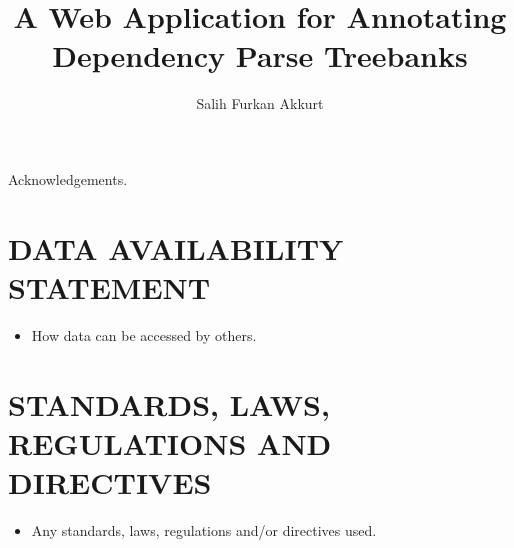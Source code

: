 \documentclass[a4paper,onesided,12pt]{report}
\title{A Web Application for Annotating Dependency Parse Treebanks}
\author{Salih Furkan Akkurt}
\begin{document}
\makebstitle  %
\makeapprovalpage
\begin{acknowledgements}
Acknowledgements.
\end{acknowledgements}




\tableofcontents
\listoffigures
\listoftables
\begin{symbols}


\end{symbols}

\begin{abbreviations}
\end{abbreviations}











\appendix
\chapter{DATA AVAILABILITY STATEMENT}
\begin{itemize}
\item How data can be accessed by others.
\end{itemize}


\chapter{STANDARDS, LAWS, REGULATIONS AND DIRECTIVES}
\begin{itemize}
\item Any standards, laws, regulations and/or directives used.
\end{itemize}
\end{document}

